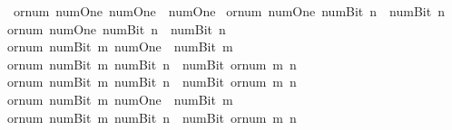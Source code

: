 \begin{isabellebody}
\isanewline
\ \ {\isacartoucheopen}or{\isacharunderscore}{\kern0pt}num\ num{\isachardot}{\kern0pt}One\ num{\isachardot}{\kern0pt}One\ {\isacharequal}{\kern0pt}\ num{\isachardot}{\kern0pt}One{\isacartoucheclose}\isanewline
{\isacharbar}{\kern0pt}\ {\isacartoucheopen}or{\isacharunderscore}{\kern0pt}num\ num{\isachardot}{\kern0pt}One\ {\isacharparenleft}{\kern0pt}num{\isachardot}{\kern0pt}Bit{}\ n{\isacharparenright}{\kern0pt}\ {\isacharequal}{\kern0pt}\ num{\isachardot}{\kern0pt}Bit{}\ n{\isacartoucheclose}\isanewline
{\isacharbar}{\kern0pt}\ {\isacartoucheopen}or{\isacharunderscore}{\kern0pt}num\ num{\isachardot}{\kern0pt}One\ {\isacharparenleft}{\kern0pt}num{\isachardot}{\kern0pt}Bit{}\ n{\isacharparenright}{\kern0pt}\ {\isacharequal}{\kern0pt}\ num{\isachardot}{\kern0pt}Bit{}\ n{\isacartoucheclose}\isanewline
{\isacharbar}{\kern0pt}\ {\isacartoucheopen}or{\isacharunderscore}{\kern0pt}num\ {\isacharparenleft}{\kern0pt}num{\isachardot}{\kern0pt}Bit{}\ m{\isacharparenright}{\kern0pt}\ num{\isachardot}{\kern0pt}One\ {\isacharequal}{\kern0pt}\ num{\isachardot}{\kern0pt}Bit{}\ m{\isacartoucheclose}\isanewline
{\isacharbar}{\kern0pt}\ {\isacartoucheopen}or{\isacharunderscore}{\kern0pt}num\ {\isacharparenleft}{\kern0pt}num{\isachardot}{\kern0pt}Bit{}\ m{\isacharparenright}{\kern0pt}\ {\isacharparenleft}{\kern0pt}num{\isachardot}{\kern0pt}Bit{}\ n{\isacharparenright}{\kern0pt}\ {\isacharequal}{\kern0pt}\ num{\isachardot}{\kern0pt}Bit{}\ {\isacharparenleft}{\kern0pt}or{\isacharunderscore}{\kern0pt}num\ m\ n{\isacharparenright}{\kern0pt}{\isacartoucheclose}\isanewline
{\isacharbar}{\kern0pt}\ {\isacartoucheopen}or{\isacharunderscore}{\kern0pt}num\ {\isacharparenleft}{\kern0pt}num{\isachardot}{\kern0pt}Bit{}\ m{\isacharparenright}{\kern0pt}\ {\isacharparenleft}{\kern0pt}num{\isachardot}{\kern0pt}Bit{}\ n{\isacharparenright}{\kern0pt}\ {\isacharequal}{\kern0pt}\ num{\isachardot}{\kern0pt}Bit{}\ {\isacharparenleft}{\kern0pt}or{\isacharunderscore}{\kern0pt}num\ m\ n{\isacharparenright}{\kern0pt}{\isacartoucheclose}\isanewline
{\isacharbar}{\kern0pt}\ {\isacartoucheopen}or{\isacharunderscore}{\kern0pt}num\ {\isacharparenleft}{\kern0pt}num{\isachardot}{\kern0pt}Bit{}\ m{\isacharparenright}{\kern0pt}\ num{\isachardot}{\kern0pt}One\ {\isacharequal}{\kern0pt}\ num{\isachardot}{\kern0pt}Bit{}\ m{\isacartoucheclose}\isanewline
{\isacharbar}{\kern0pt}\ {\isacartoucheopen}or{\isacharunderscore}{\kern0pt}num\ {\isacharparenleft}{\kern0pt}num{\isachardot}{\kern0pt}Bit{}\ m{\isacharparenright}{\kern0pt}\ {\isacharparenleft}{\kern0pt}num{\isachardot}{\kern0pt}Bit{}\ n{\isacharparenright}{\kern0pt}\ {\isacharequal}{\kern0pt}\ num{\isachardot}{\kern0pt}Bit{}\ {\isacharparenleft}{\kern0pt}or{\isacharunderscore}{\kern0pt}num\ m\ n{\isacharparenright}{\kern0pt}{\isacartoucheclose}\isanewline

\end{isabellebody}
